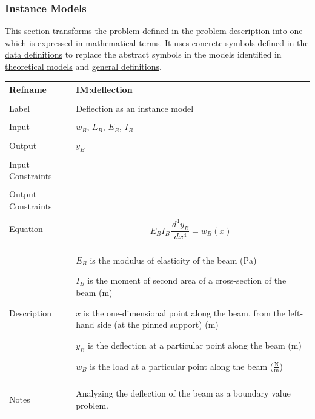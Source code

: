 \documentclass[12pt]{article}
\begin{document}
\subsubsection{Instance Models}
\label{Sec:IMs}
This section transforms the problem defined in the \hyperref[Sec:ProbDesc]{problem description} into one which is expressed in mathematical terms. It uses concrete symbols defined in the \hyperref[Sec:DDs]{data definitions} to replace the abstract symbols in the models identified in \hyperref[Sec:TMs]{theoretical models} and \hyperref[Sec:GDs]{general definitions}.

\vspace{\baselineskip}
\noindent
\begin{minipage}{\textwidth}
\begin{tabular}{>{\raggedright}p{}>{\raggedright\arraybackslash}p{}}
\toprule \textbf{Refname} & \textbf{IM:deflection}
\label{IM:deflection}
\\ \midrule \\
Label & Deflection as an instance model
        
\\ \midrule \\
Input & ${w_{B}}$, ${L_{B}}$, ${E_{B}}$, ${I_{B}}$
        
\\ \midrule \\
Output & ${y_{B}}$
         
\\ \midrule \\
Input Constraints & 
\\ \midrule \\
Output Constraints & 
\\ \midrule \\
Equation & \begin{displaymath}
           {E_{B}} {I_{B}} \frac{\,d^{4}{y_{B}}}{\,dx^{4}}={w_{B}}\left(x\right)
           \end{displaymath}
\\ \midrule \\
Description & \begin{symbDescription}
              \item{${E_{B}}$ is the modulus of elasticity of the beam (${\text{Pa}}$)}
              \item{${I_{B}}$ is the moment of second area of a cross-section of the beam (${\text{m}}$)}
              \item{$x$ is the one-dimensional point along the beam, from the left-hand side (at the pinned support) (${\text{m}}$)}
              \item{${y_{B}}$ is the deflection at a particular point along the beam (${\text{m}}$)}
              \item{${w_{B}}$ is the load at a particular point along the beam ($\frac{\text{N}}{\text{m}}$)}
              \end{symbDescription}
\\ \midrule \\
Notes & Analyzing the deflection of the beam as a boundary value problem.
        

\end{tabular}
\end{minipage}
\end{document}
